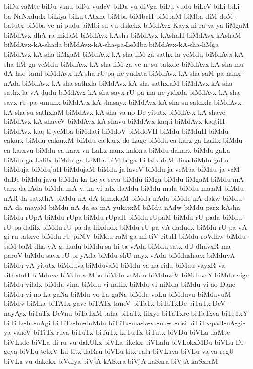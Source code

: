 {biDu-vaMte
biDu-vanu
biDu-vudeV
biDu-vu-diVga
biDu-vudu
biLeV
biLi
biLi-ba-NaNxdudx
biLiya
biLu-tAtxne
biMba
biMbaH
biMbaM
biMba-diM-doM-batutx
biMba-ve-ni-pudu
biMbi-su-vu-dakekx
biMdAvx-Kayx-ni-ra-va-ya-liMgaM
biMdAvx-dhA-ra-midaM
biMdAvx-kAsha
biMdAvx-kAshaH
biMdAvx-kAshaM
biMdAvx-kA-shada
biMdAvx-kA-sha-ga-LeMba
biMdAvx-kA-sha-liMga
biMdAvx-kA-sha-liMgaM
biMdAvx-kA-sha-liM-ga-sathx-la-veMdu
biMdAvx-kA-sha-liM-ga-veMdu
biMdAvx-kA-sha-liM-ga-ve-ni-su-tatxde
biMdAvx-kA-sha-mu-dA-haq-tamf
biMdAvx-kA-sha-rU-pa-ne-yudxta
biMdAvx-kA-sha-saM-pa-nanx-nAda
biMdAvx-kA-sha-sathxla
biMdAvx-kA-sha-sathxlaM
biMdAvx-kA-sha-sathx-la-vA-dudu
biMdAvx-kA-sha-savx-rU-pa-ma-ne-yidxda
biMdAvx-kA-sha-savx-rU-pa-vanunx
biMdAvx-kA-shasayx
biMdAvx-kA-sha-su-sathxla
biMdAvx-kA-sha-su-sathxlaM
biMdAvx-kA-sha-va-no-De-yitutx
biMdAvx-kA-shave
biMdAvx-kA-shaveV
biMdAvx-kA-shavu
biMdAvx-kaqti
biMdAvx-kaqtiH
biMdAvx-kaq-ti-yeMba
biMdati
biMdoV
biMdoVH
biMdu
biMduH
biMdu-cakarx
biMdu-cakarxM
biMdu-ca-karx-do-Lage
biMdu-ca-karx-ga-Lalilx
biMdu-ca-karxvu
biMdu-ca-karx-vu-LaLx-nanx-kakxra
biMdu-dakarx
biMdu-gaLa
biMdu-ga-Lalilx
biMdu-ga-LeMba
biMdu-ga-Li-lalx-daM-dina
biMdu-gaLu
biMduja
biMdujaH
biMdujaM
biMdu-ja-laveV
biMdu-ja-veMba
biMdu-ja-veM-daDe
biMdu-javu
biMdu-ka-Le-ye-seva
biMdu-liMga
biMdu-liMgaM
biMdu-mA-tarx-da-lAda
biMdu-mA-yi-ka-vi-lalx-daMdu
biMdu-mala
biMdu-malaM
biMdu-nAR-da-satxthA
biMdu-nA-dA-tamxkaM
biMdu-nAda
biMdu-nA-dakw
biMdu-nA-da-mayaM
biMdu-nA-da-sa-mA-yukatxM
biMdu-nAdw
biMdu-parx-kAsha
biMdu-rUpA
biMdu-rUpa
biMdu-rUpaH
biMdu-rUpaM
biMdu-rU-pada
biMdu-rU-pa-dalilx
biMdu-rU-pa-da-lilxdudx
biMdu-rU-pa-vA-dadudx
biMdu-rU-pa-vA-gi-ru-tatxve
biMdu-rU-piNiV
biMdu-raM-ga-mi-tiV-ritaH
biMdu-roVdhw
biMdu-saM-baM-dha-vA-gi-hudu
biMdu-sa-hi-ta-vAda
biMdu-satx-dU-dhavxR-ma-paroV
biMdu-savx-rU-pi-yAda
biMdu-shU-nayx-vAda
biMdushacx
biMduvA
biMdu-vA-yitutx
biMduva
biMduvaM
biMdu-va-na-ridu
biMdu-vayxR-va-sithxtaH
biMduve
biMdu-veMba
biMdu-veMda
biMduveV
biMduveY
biMdu-vige
biMdu-vilalx
biMdu-vina
biMdu-vi-nalilx
biMdu-vi-niMda
biMdu-vi-no-Dane
biMdu-vi-no-La-gaNa
biMdu-vo-La-gaNa
biMdu-voLu
biMduvu
biMduvuM
biMdw
biMka
biTATx-gave
biTATx-taneV
biTaTx
biTaTxDe
biTaTx-DeV-nayAyx
biTaTx-DeVnu
biTaTxM-taha
biTaTx-lilxye
biTaTxre
biTaTxva
biTeTxY
biTiTx-ha-nAgi
biTiTx-hu-doMdu
biTiTx-ma-la-va-nu-sa-risi
biTiTx-paR-nA-gi-ya-vaneV
biTiTx-ruva
biTuTx
biTuTx-koTuTx
biTutx
biVDu
biVLa-daMte
biVLade
biVLa-di-ru-vu-dakUkx
biVLa-likekx
biVLalu
biVLokxMDu
biVLu-Di-geya
biVLu-tetxV-Lu-titx-daRru
biVLu-titx-ralu
biVLuva
biVLu-va-va-regU
biVLu-vu-dakekx
biVdiya
biVjA-kASxra
biVjA-kaSxra
biVjA-kaSxraM
}
